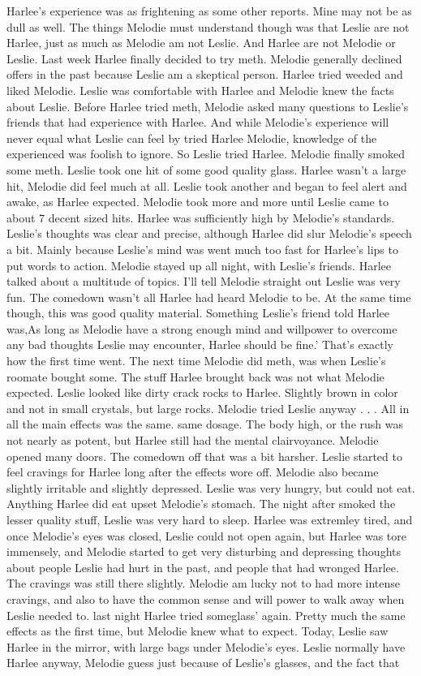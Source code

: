 \documentclass[12pt]{book}
\begin{document}
Harlee's experience was as frightening as some other reports. Mine may not be as dull as well. The things Melodie must understand though was that Leslie are not Harlee, just as much as Melodie am not Leslie. And Harlee are not Melodie or Leslie. Last week Harlee finally decided to try meth. Melodie generally declined offers in the past because Leslie am a skeptical person. Harlee tried weeded and liked Melodie. Leslie was comfortable with Harlee and Melodie knew the facts about Leslie. Before Harlee tried meth, Melodie asked many questions to Leslie's friends that had experience with Harlee. And while Melodie's experience will never equal what Leslie can feel by tried Harlee Melodie, knowledge of the experienced was foolish to ignore. So Leslie tried Harlee. Melodie finally smoked some meth. Leslie took one hit of some good quality glass. Harlee wasn't a large hit, Melodie did feel much at all. Leslie took another and began to feel alert and awake, as Harlee expected. Melodie took more and more until Leslie came to about 7 decent sized hits. Harlee was sufficiently high by Melodie's standards. Leslie's thoughts was clear and precise, although Harlee did slur Melodie's speech a bit. Mainly because Leslie's mind was went much too fast for Harlee's lips to put words to action. Melodie stayed up all night, with Leslie's friends. Harlee talked about a multitude of topics. I'll tell Melodie straight out Leslie was very fun. The comedown wasn't all Harlee had heard Melodie to be. At the same time though, this was good quality material. Something Leslie's friend told Harlee was,As long as Melodie have a strong enough mind and willpower to overcome any bad thoughts Leslie may encounter, Harlee should be fine.' That's exactly how the first time went. The next time Melodie did meth, was when Leslie's roomate bought some. The stuff Harlee brought back was not what Melodie expected. Leslie looked like dirty crack rocks to Harlee. Slightly brown in color and not in small crystals, but large rocks. Melodie tried Leslie anyway . . .  All in all the main effects was the same. same dosage. The body high, or the rush was not nearly as potent, but Harlee still had the mental clairvoyance. Melodie opened many doors. The comedown off that was a bit harsher. Leslie started to feel cravings for Harlee long after the effects wore off. Melodie also became slightly irritable and slightly depressed. Leslie was very hungry, but could not eat. Anything Harlee did eat upset Melodie's stomach. The night after smoked the lesser quality stuff, Leslie was very hard to sleep. Harlee was extremley tired, and once Melodie's eyes was closed, Leslie could not open again, but Harlee was tore immensely, and Melodie started to get very disturbing and depressing thoughts about people Leslie had hurt in the past, and people that had wronged Harlee. The cravings was still there slightly. Melodie am lucky not to had more intense cravings, and also to have the common sense and will power to walk away when Leslie needed to. last night Harlee tried someglass' again. Pretty much the same effects as the first time, but Melodie knew what to expect. Today, Leslie saw Harlee in the mirror, with large bags under Melodie's eyes. Leslie normally have Harlee anyway, Melodie guess just because of Leslie's glasses, and the fact that 
\end{document}
